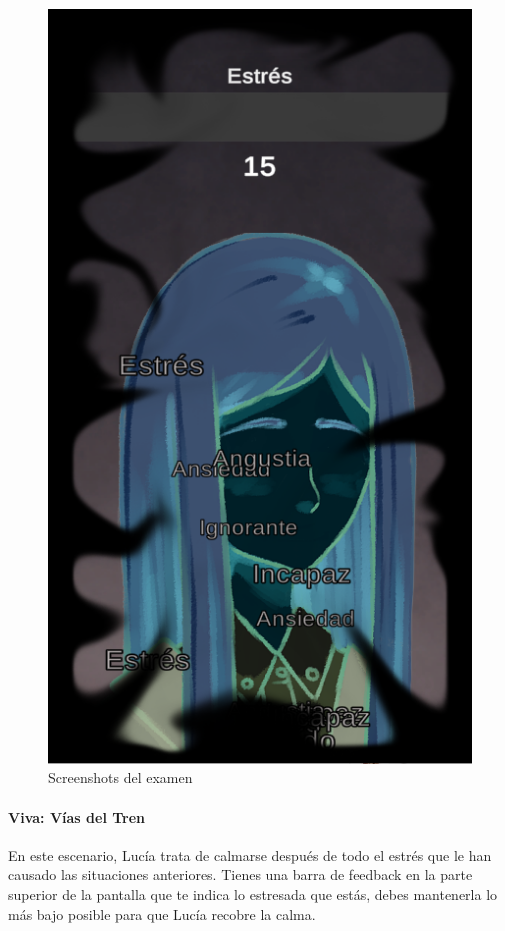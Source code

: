 \begin{figure}[h]
\begin{minipage}{0.45\textwidth}
\begin{flushright}
	   		\includegraphics[scale=.5]{imgs/screenshot04.png}
		\end{flushright}
	\end{minipage}
	\caption{Screenshots del examen}
	\label{multifig:examen}
\end{figure}

\newpage
\paragraph{Viva: Vías del Tren}
En este escenario, Lucía trata de calmarse después de todo el estrés que le han causado las situaciones anteriores. Tienes una barra de feedback en la parte superior de la pantalla que te indica lo estresada que estás, debes mantenerla lo más bajo posible para que Lucía recobre la calma.

